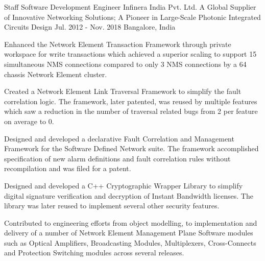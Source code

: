 \begin{cventries}
  \expentry
    {Staff Software Development Engineer} %
    {Infinera} {India Pvt. Ltd.} %
    {A Global Supplier of Innovative Networking Solutions; A Pioneer in Large-Scale Photonic Integrated Circuits Design} %
    {Jul. 2012 - Nov. 2018} %
    {Bangalore, India} %
    {
      \begin{cvitems} %
      \item {Enhanced the Network Element Transaction Framework through private workspace for write transactions which achieved a superior scaling to support 15 simultaneous NMS connections compared to only 3 NMS connections by a 64 chassis Network Element cluster.}
      \item {Created a Network Element Link Traversal Framework to simplify the fault correlation logic. The framework, later patented, was reused by multiple features which saw a reduction in the number of traversal related bugs from 2 per feature on average to 0.}
      \item {Designed and developed a declarative Fault Correlation and Management Framework for the Software Defined Network suite. The framework accomplished specification of new alarm definitions and fault correlation rules without recompilation and was filed for a patent.}
      \item {Designed and developed a C++ Cryptographic Wrapper Library to simplify digital signature verification and decryption of Instant Bandwidth licenses. The library was later reused to implement several other security features.}
      \item {Contributed to engineering efforts from object modelling, to implementation and delivery of a number of Network Element Management Plane Software modules such as Optical Amplifiers, Broadcasting Modules, Multiplexers, Cross-Connects and Protection Switching modules across several releases.}
      \end{cvitems}
    }


\end{cventries}
